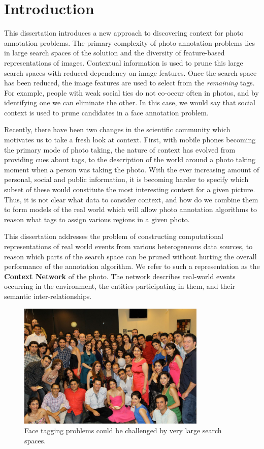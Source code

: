 \chapter{Introduction}

This dissertation introduces a new approach to discovering context for photo annotation problems. The primary complexity of photo annotation problems lies in large search spaces of the solution and the diversity of feature-based representations of images. Contextual information is used to prune this large search spaces with reduced dependency on image features. Once the search space has been reduced, the image features are used to select from the \textit{remaining} tags. For example, people with weak social ties do not co-occur often in photos, and by identifying one we can eliminate the other. In this case, we would say that social context is used to prune candidates in a face annotation problem.

Recently, there have been two changes in the scientific community which motivates us to take a fresh look at context. First, with mobile phones becoming the primary mode of photo taking, the nature of context has evolved from providing cues about tags, to the description of the world around a photo taking moment when a person was taking the photo. With the ever increasing amount of personal, social and public information, it is becoming harder to specify which subset of these would constitute the most interesting context for a given picture. Thus, it is not clear what data to consider context, and how do we combine them to form models of the real world which will allow photo annotation algorithms to reason what tags to assign various regions in a given photo.

This dissertation addresses the problem of constructing computational representations of real world events from various heterogeneous data sources, to reason which parts of the search space can be pruned without hurting the overall performance of the annotation algorithm. We refer to such a representation as the \textbf{Context Network} of the photo. The network describes real-world events occurring in the environment, the entities participating in them, and their semantic inter-relationships.

\begin{figure}[t]
\centering
\includegraphics[width=0.8\textwidth]{media/chapter1/setarehetal}
\caption{Face tagging problems could be challenged by very large search spaces.}
\label{fig:people}
\end{figure}


